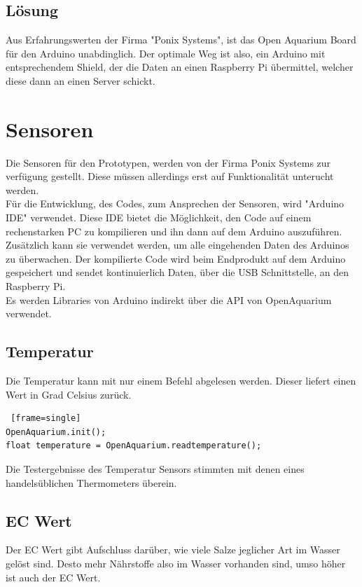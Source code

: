\documentclass[11pt]{article}
\begin{document}
\subsection{L\"osung}
Aus Erfahrungswerten der Firma "Ponix Systems", ist das Open Aquarium Board f\"ur den Arduino unabdinglich. Der optimale Weg ist also, ein Arduino mit entsprechendem Shield, der die Daten an einen Raspberry Pi \"ubermittel, welcher diese dann an einen Server schickt.
\newpage
\section{Sensoren}
Die Sensoren für den Prototypen, werden von der Firma Ponix Systems zur verfügung gestellt. Diese müssen allerdings erst auf Funktionalität unterucht werden. \\
F\"ur die Entwicklung, des Codes, zum Ansprechen der Sensoren, wird "Arduino IDE" verwendet. Diese IDE bietet die M\"oglichkeit, den Code auf einem rechenstarken PC zu kompilieren und ihn dann auf dem Arduino auszuf\"uhren. Zus\"atzlich kann sie verwendet werden, um alle eingehenden Daten des Arduinos zu \"uberwachen.
Der kompilierte Code wird beim Endprodukt auf dem Arduino gespeichert und sendet kontinuierlich Daten, \"uber die USB Schnittstelle, an den Raspberry Pi.\\
Es werden Libraries von Arduino indirekt über die API von OpenAquarium verwendet.

\subsection{Temperatur}
Die Temperatur kann mit nur einem Befehl abgelesen werden. Dieser liefert einen Wert in Grad Celsius zur\"uck.
\begin{lstlisting} [frame=single]
OpenAquarium.init();
float temperature = OpenAquarium.readtemperature();
\end{lstlisting}
Die Testergebnisse des Temperatur Sensors stimmten mit denen eines handels\"ublichen Thermometers \"uberein.

\subsection{EC Wert}
Der EC Wert gibt Aufschluss dar\"uber, wie viele Salze jeglicher Art im Wasser gel\"ost sind. Desto mehr N\"ahrstoffe also im Wasser vorhanden sind, umso h\"oher ist auch der EC Wert.
\end{document}
